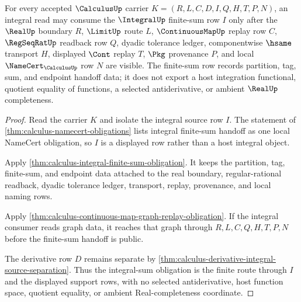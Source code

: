 \begin{theorem}
\label{thm:calculus-integral-sum-obligation}
For every accepted $\CalculusUp$ carrier $K=(R,L,C,D,I,Q,H,T,P,N)$, an integral read may consume the $\IntegralUp$ finite-sum row $I$ only after the $\RealUp$ boundary $R$, $\LimitUp$ route $L$, $\ContinuousMapUp$ replay row $C$, $\RegSeqRatUp$ readback row $Q$, dyadic tolerance ledger, componentwise $\hsame$ transport $H$, displayed $\Cont$ replay $T$, $\Pkg$ provenance $P$, and local $\NameCert_{\CalculusUp}$ row $N$ are visible. The finite-sum row records partition, tag, sum, and endpoint handoff data; it does not export a host integration functional, quotient equality of functions, a selected antiderivative, or ambient $\RealUp$ completeness.
\end{theorem}
\begin{proof}
Read the carrier $K$ and isolate the integral source row $I$. The statement of \autoref{thm:calculus-namecert-obligations} lists integral finite-sum handoff as one local NameCert obligation, so $I$ is a displayed row rather than a host integral object.

Apply \autoref{thm:calculus-integral-finite-sum-obligation}. It keeps the partition, tag, finite-sum, and endpoint data attached to the real boundary, regular-rational readback, dyadic tolerance ledger, transport, replay, provenance, and local naming rows.

Apply \autoref{thm:calculus-continuous-map-graph-replay-obligation}. If the integral consumer reads graph data, it reaches that graph through $R,L,C,Q,H,T,P,N$ before the finite-sum handoff is public.

The derivative row $D$ remains separate by \autoref{thm:calculus-derivative-integral-source-separation}. Thus the integral-sum obligation is the finite route through $I$ and the displayed support rows, with no selected antiderivative, host function space, quotient equality, or ambient Real-completeness coordinate.
\end{proof}

